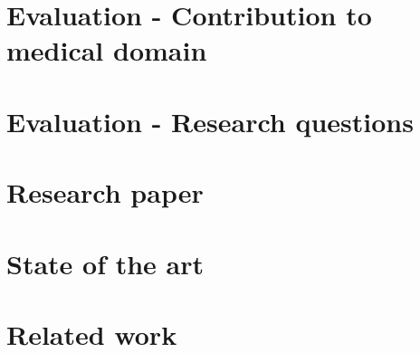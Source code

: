 \documentclass[20pt]{extarticle}
\begin{document}
	\section{Evaluation - Contribution to medical domain}
	
	\section{Evaluation - Research questions}

	\section{Research paper}

	\section{State of the art}

	\section{Related work}
\end{document}
